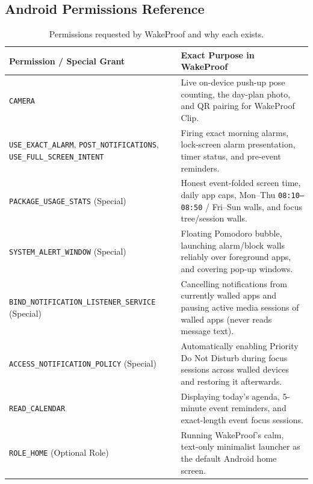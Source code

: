 \documentclass[11pt,a4paper]{article}
\begin{document}
\subsection{Android Permissions Reference}
\begin{table}[ht!]
\centering
\footnotesize
\begin{tabularx}{\textwidth}{@{}L{5.6cm}Y@{}}
\toprule
\textbf{\sffamily Permission / Special Grant} & \textbf{\sffamily Exact Purpose in WakeProof} \\
\midrule
\texttt{CAMERA} & Live on-device push-up pose counting, the day-plan photo, and QR pairing for WakeProof Clip. \\
\texttt{USE\_EXACT\_ALARM}, \texttt{POST\_NOTIFICATIONS}, \newline \texttt{USE\_FULL\_SCREEN\_INTENT} & Firing exact morning alarms, lock-screen alarm presentation, timer status, and pre-event reminders. \\
\texttt{PACKAGE\_USAGE\_STATS} {\scriptsize (Special)} & Honest event-folded screen time, daily app caps, Mon--Thu \texttt{08:10--08:50} / Fri--Sun walls, and focus tree/session walls. \\
\texttt{SYSTEM\_ALERT\_WINDOW} {\scriptsize (Special)} & Floating Pomodoro bubble, launching alarm/block walls reliably over foreground apps, and covering pop-up windows. \\
\texttt{BIND\_NOTIFICATION\_LISTENER\_\allowbreak SERVICE} {\scriptsize (Special)} & Cancelling notifications from currently walled apps and pausing active media sessions of walled apps (never reads message text). \\
\texttt{ACCESS\_NOTIFICATION\_POLICY} {\scriptsize (Special)} & Automatically enabling Priority Do Not Disturb during focus sessions across walled devices and restoring it afterwards. \\
\texttt{READ\_CALENDAR} & Displaying today's agenda, 5-minute event reminders, and exact-length event focus sessions. \\
\texttt{ROLE\_HOME} {\scriptsize (Optional Role)} & Running WakeProof's calm, text-only minimalist launcher as the default Android home screen. \\
\bottomrule
\end{tabularx}
\caption{Permissions requested by WakeProof and why each exists.}
\end{table}
\end{document}
